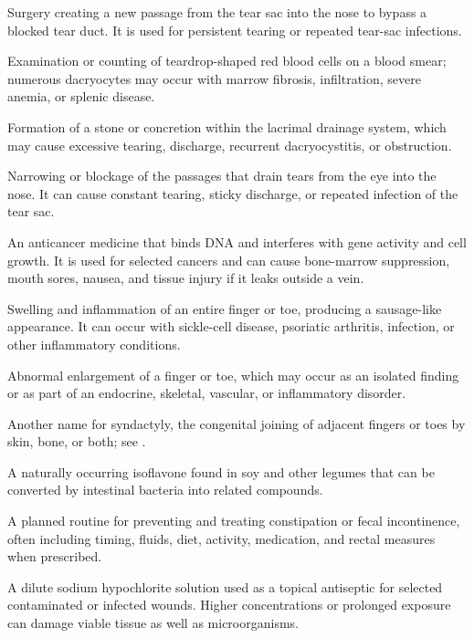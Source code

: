  Surgery creating a new passage from the tear sac into the nose to bypass a blocked tear duct. It is used for persistent tearing or repeated tear-sac infections.

 Examination or counting of teardrop-shaped red blood cells on a blood smear; numerous dacryocytes may occur with marrow fibrosis, infiltration, severe anemia, or splenic disease.

 Formation of a stone or concretion within the lacrimal drainage system, which may cause excessive tearing, discharge, recurrent dacryocystitis, or obstruction.

 Narrowing or blockage of the passages that drain tears from the eye into the nose. It can cause constant tearing, sticky discharge, or repeated infection of the tear sac.

 An anticancer medicine that binds DNA and interferes with gene activity and cell growth. It is used for selected cancers and can cause bone-marrow suppression, mouth sores, nausea, and tissue injury if it leaks outside a vein.

 Swelling and inflammation of an entire finger or toe, producing a sausage-like appearance. It can occur with sickle-cell disease, psoriatic arthritis, infection, or other inflammatory conditions.

 Abnormal enlargement of a finger or toe, which may occur as an isolated finding or as part of an endocrine, skeletal, vascular, or inflammatory disorder.

 Another name for syndactyly, the congenital joining of adjacent fingers or toes by skin, bone, or both; see .

 A naturally occurring isoflavone found in soy and other legumes that can be converted by intestinal bacteria into related compounds.

 A planned routine for preventing and treating constipation or fecal incontinence, often including timing, fluids, diet, activity, medication, and rectal measures when prescribed.

 A dilute sodium hypochlorite solution used as a topical antiseptic for selected contaminated or infected wounds. Higher concentrations or prolonged exposure can damage viable tissue as well as microorganisms.

